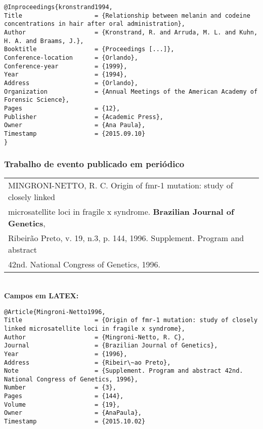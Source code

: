 \begin{verbatim}
@Inproceedings{kronstrand1994,
Title                    = {Relationship between melanin and codeine
concentrations in hair after oral administration},
Author                   = {Kronstrand, R. and Arruda, M. L. and Kuhn, 
H. A. and Braams, J.},
Booktitle                = {Proceedings [...]},
Conference-location      = {Orlando},
Conference-year          = {1999},
Year                     = {1994},
Address                  = {Orlando},
Organization             = {Annual Meetings of the American Academy of 
Forensic Science},
Pages                    = {12},
Publisher                = {Academic Press},
Owner                    = {Ana Paula},
Timestamp                = {2015.09.10}
}
\end{verbatim}

\subsubsection{Trabalho de evento publicado em peri\'odico} 

\begin{tabular}{|l|c|} \hline
	MINGRONI-NETTO, R. C. Origin of fmr-1 mutation: study of closely linked \\microsatellite loci in fragile x syndrome. \textbf{Brazilian Journal of Genetics}, \\Ribeir\~ao Preto, v. 19, n.3, p. 144, 1996. Supplement. Program and abstract \\42nd. National Congress of Genetics, 1996. 
	\\\hline
\end{tabular} \\

\textbf{Campos em LATEX:} 

\begin{verbatim}
@Article{Mingroni-Netto1996,
Title                    = {Origin of fmr-1 mutation: study of closely 
linked microsatellite loci in fragile x syndrome},
Author                   = {Mingroni-Netto, R. C},
Journal                  = {Brazilian Journal of Genetics},
Year                     = {1996},
Address                  = {Ribeir\~ao Preto},
Note                     = {Supplement. Program and abstract 42nd. 
National Congress of Genetics, 1996},
Number                   = {3},
Pages                    = {144},
Volume                   = {19},
Owner                    = {AnaPaula},
Timestamp                = {2015.10.02}
\end{verbatim} \\

